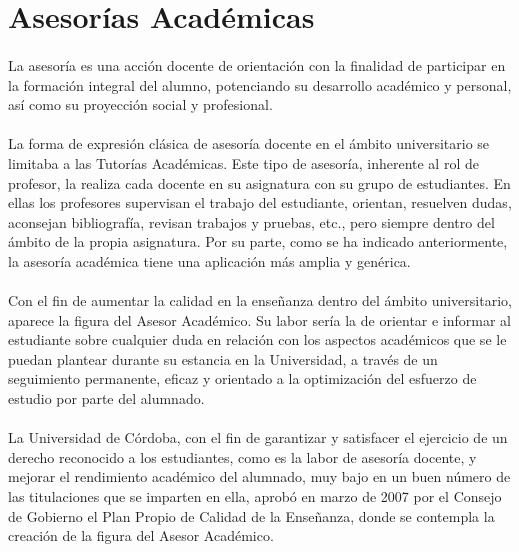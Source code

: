 \section{Asesorías Académicas}

\paragraph{}La asesoría es una acción docente de orientación con la finalidad de
participar en la formación integral del alumno, potenciando su desarrollo
académico y personal, así como su proyección social y profesional.

\paragraph{}La forma de expresión clásica de asesoría docente en el ámbito
universitario se limitaba a las Tutorías Académicas. Este tipo de asesoría,
inherente al rol de profesor, la realiza cada docente en su asignatura con su
grupo de estudiantes. En ellas los profesores supervisan el trabajo del
estudiante, orientan, resuelven dudas, aconsejan bibliografía, revisan trabajos
y pruebas, etc., pero siempre dentro del ámbito de la propia asignatura. Por su
parte, como se ha indicado anteriormente, la asesoría académica tiene una
aplicación más amplia y genérica.

\paragraph{}Con el fin de aumentar la calidad en la enseñanza dentro del ámbito
universitario, aparece la figura del Asesor Académico. Su labor sería la
de orientar e informar al estudiante sobre cualquier duda en relación con los
aspectos académicos que se le puedan plantear durante su estancia en la
Universidad, a través de un seguimiento permanente, eficaz y orientado a la
optimización del esfuerzo de estudio por parte del alumnado.

\paragraph{}La Universidad de Córdoba, con el fin de garantizar y satisfacer el
ejercicio de un derecho reconocido a los estudiantes, como es la labor de
asesoría docente, y mejorar el rendimiento académico del alumnado, muy bajo en
un buen número de las titulaciones que se imparten en ella, aprobó en marzo de
2007 por el Consejo de Gobierno el Plan Propio de Calidad de la Enseñanza, donde
se contempla la creación de la figura del Asesor Académico.


